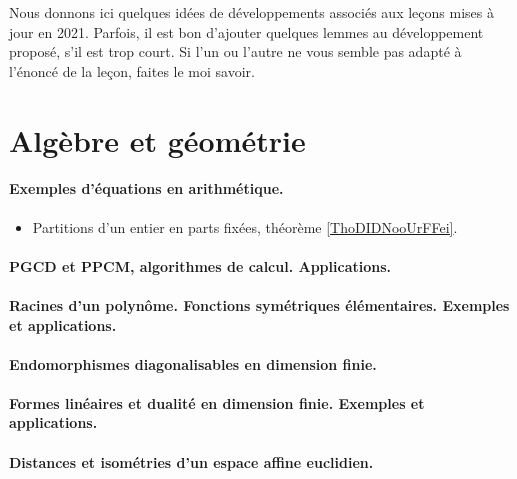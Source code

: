 
Nous donnons ici quelques idées de développements associés aux leçons mises à jour en 2021. Parfois, il est bon d'ajouter quelques lemmes au développement proposé, s'il est trop court. Si l'un ou l'autre ne vous semble pas adapté à l'énoncé de la leçon, faites le moi savoir.

\section{Algèbre et géométrie}

\paragraph{Exemples d'équations en arithmétique.}

\begin{itemize}
    \item Partitions d'un entier en parts fixées, théorème \ref{ThoDIDNooUrFFei}.
\end{itemize}


\paragraph{PGCD et PPCM, algorithmes de calcul. Applications.}
\paragraph{Racines d'un polynôme. Fonctions symétriques élémentaires. Exemples et applications.}
\paragraph{Endomorphismes diagonalisables en dimension finie.}
\paragraph{Formes linéaires et dualité en dimension finie. Exemples et applications.}
\paragraph{Distances et isométries d'un espace affine euclidien.}
